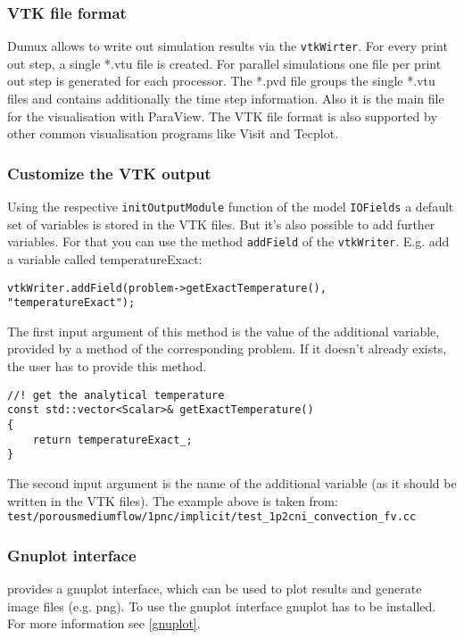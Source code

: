 \subsubsection{VTK file format}
Dumux allows to write out simulation results via the \texttt{vtkWirter}.
For every print out step, a single *.vtu file is created. For parallel simulations one file
per print out step is generated for each processor. 
The *.pvd file groups the single *.vtu files and contains additionally the time step information.
Also it is the main file for the visualisation with ParaView.
The VTK file format is also supported by other common visualisation programs like Visit and Tecplot. 

\subsubsection{Customize the VTK output}
Using the respective \texttt{initOutputModule} function of the model \texttt{IOFields} a default
set of variables is stored in the VTK files. But it's also possible to add further variables.
For that you can use the method \texttt{addField} of the \texttt{vtkWriter}. E.g. add a variable called temperatureExact:
\begin{lstlisting}[style=DumuxCode]
vtkWriter.addField(problem->getExactTemperature(), "temperatureExact");
\end{lstlisting}

The first input argument of this method is the value of the additional variable, provided by a method of the corresponding problem.
If it doesn't already exists, the user has to provide this method.
\begin{lstlisting}[style=DumuxCode]
//! get the analytical temperature
const std::vector<Scalar>& getExactTemperature()
{
    return temperatureExact_;
}
\end{lstlisting}

The second input argument is the name of the additional variable (as it should be written in the VTK files).
The example above is taken from:\\ \texttt{test/porousmediumflow/1pnc/implicit/test\_1p2cni\_convection\_fv.cc}

\subsubsection{Gnuplot interface}
\Dumux provides a gnuplot interface, which can be used to plot results and generate 
image files (e.g. png). To use the gnuplot interface gnuplot has to be installed. For more information see \ref{gnuplot}.

